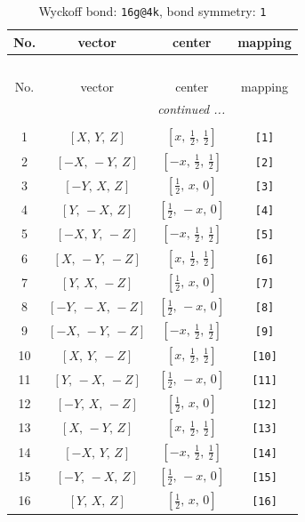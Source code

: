 \documentclass[fleqn,8pt]{jsarticle}
\begin{document}
\begin{longtable}{cccc}
\caption{Wyckoff bond: {\tt 16g@4k}, bond symmetry: {\tt 1}}
 \\
 \hline \hline
No. & vector & center & mapping \\ \hline \endfirsthead

\multicolumn{3}{l}{\tablename\ \thetable{}} \\
 \hline \hline
No. & vector & center & mapping \\ \hline \endhead

 \hline \hline
\multicolumn{3}{r}{\footnotesize\it continued ...} \\ \endfoot

 \hline \hline
\multicolumn{3}{r}{} \\ \endlastfoot

1 & $\left[ X,\, Y,\, Z \right]$ & $\left[ x,\, \frac{1}{2},\, \frac{1}{2} \right]$ & {\tt [1]} \\ \hline
2 & $\left[ - X,\, - Y,\, Z \right]$ & $\left[ - x,\, \frac{1}{2},\, \frac{1}{2} \right]$ & {\tt [2]} \\ \hline
3 & $\left[ - Y,\, X,\, Z \right]$ & $\left[ \frac{1}{2},\, x,\, 0 \right]$ & {\tt [3]} \\ \hline
4 & $\left[ Y,\, - X,\, Z \right]$ & $\left[ \frac{1}{2},\, - x,\, 0 \right]$ & {\tt [4]} \\ \hline
5 & $\left[ - X,\, Y,\, - Z \right]$ & $\left[ - x,\, \frac{1}{2},\, \frac{1}{2} \right]$ & {\tt [5]} \\ \hline
6 & $\left[ X,\, - Y,\, - Z \right]$ & $\left[ x,\, \frac{1}{2},\, \frac{1}{2} \right]$ & {\tt [6]} \\ \hline
7 & $\left[ Y,\, X,\, - Z \right]$ & $\left[ \frac{1}{2},\, x,\, 0 \right]$ & {\tt [7]} \\ \hline
8 & $\left[ - Y,\, - X,\, - Z \right]$ & $\left[ \frac{1}{2},\, - x,\, 0 \right]$ & {\tt [8]} \\ \hline
9 & $\left[ - X,\, - Y,\, - Z \right]$ & $\left[ - x,\, \frac{1}{2},\, \frac{1}{2} \right]$ & {\tt [9]} \\ \hline
10 & $\left[ X,\, Y,\, - Z \right]$ & $\left[ x,\, \frac{1}{2},\, \frac{1}{2} \right]$ & {\tt [10]} \\ \hline
11 & $\left[ Y,\, - X,\, - Z \right]$ & $\left[ \frac{1}{2},\, - x,\, 0 \right]$ & {\tt [11]} \\ \hline
12 & $\left[ - Y,\, X,\, - Z \right]$ & $\left[ \frac{1}{2},\, x,\, 0 \right]$ & {\tt [12]} \\ \hline
13 & $\left[ X,\, - Y,\, Z \right]$ & $\left[ x,\, \frac{1}{2},\, \frac{1}{2} \right]$ & {\tt [13]} \\ \hline
14 & $\left[ - X,\, Y,\, Z \right]$ & $\left[ - x,\, \frac{1}{2},\, \frac{1}{2} \right]$ & {\tt [14]} \\ \hline
15 & $\left[ - Y,\, - X,\, Z \right]$ & $\left[ \frac{1}{2},\, - x,\, 0 \right]$ & {\tt [15]} \\ \hline
16 & $\left[ Y,\, X,\, Z \right]$ & $\left[ \frac{1}{2},\, x,\, 0 \right]$ & {\tt [16]} \\
\end{longtable}
\end{document}
